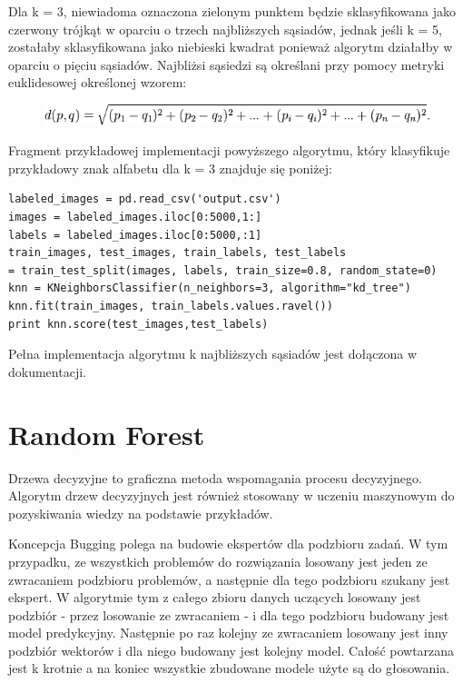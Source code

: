 \documentclass[brudnopis]{xmgr}
\begin{document}
Dla k = 3, niewiadoma oznaczona zielonym punktem będzie sklasyfikowana jako czerwony trójkąt w oparciu o trzech najbliższych sąsiadów, jednak jeśli k = 5, zostałaby sklasyfikowana jako niebieski kwadrat ponieważ algorytm działałby w oparciu o pięciu sąsiadów. Najbliżsi sąsiedzi są określani przy pomocy metryki euklidesowej określonej wzorem:

\begin{figure}[!tbh]
\centering
\includegraphics[width=1\hsize]{fig/knn-wzor}
\end{figure}

Fragment przykładowej implementacji powyższego algorytmu, który klasyfikuje przykładowy znak alfabetu dla k = 3 znajduje się poniżej:
\newpage

\begin{verbatim}
labeled_images = pd.read_csv('output.csv')
images = labeled_images.iloc[0:5000,1:]
labels = labeled_images.iloc[0:5000,:1]
train_images, test_images, train_labels, test_labels 
= train_test_split(images, labels, train_size=0.8, random_state=0)
knn = KNeighborsClassifier(n_neighbors=3, algorithm="kd_tree")
knn.fit(train_images, train_labels.values.ravel())
print knn.score(test_images,test_labels)
\end{verbatim}

Pełna implementacja algorytmu k najbliższych sąsiadów jest dołączona w dokumentacji.

\section{Random Forest}
Drzewa decyzyjne to graficzna metoda wspomagania procesu decyzyjnego. Algorytm drzew decyzyjnych jest również stosowany w uczeniu maszynowym do pozyskiwania wiedzy na podstawie przykładów.

Koncepcja Bugging polega na budowie ekspertów dla podzbioru zadań. W tym przypadku, ze wszystkich problemów do rozwiązania losowany jest jeden ze zwracaniem podzbioru problemów, a następnie dla tego podzbioru szukany jest ekspert. W algorytmie tym z całego zbioru danych uczących losowany jest podzbiór - przez losowanie ze zwracaniem - i dla tego podzbioru budowany jest model predykcyjny. Następnie po raz kolejny ze zwracaniem losowany jest inny podzbiór wektorów i dla niego budowany jest kolejny model. Całość powtarzana jest k krotnie a na koniec wszystkie zbudowane modele użyte są do głosowania.
\end{document}
